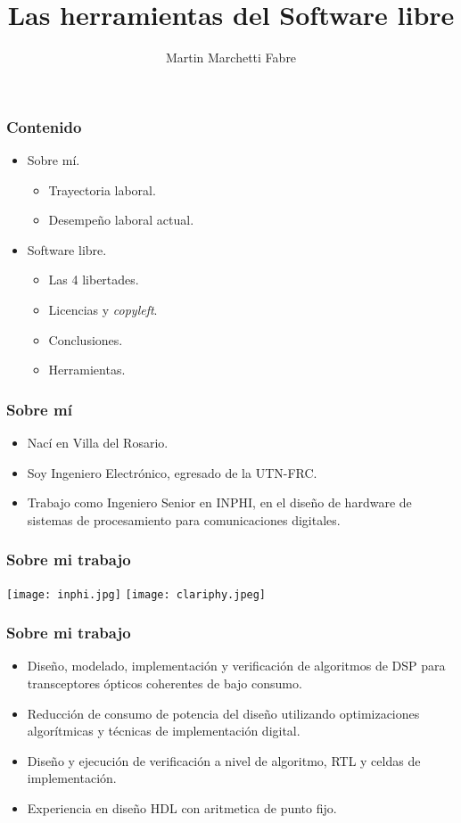 \documentclass[12pt]{beamer}
\title{Las herramientas del Software libre}
\author{Martin Marchetti Fabre}
\begin{document}
\frame{\titlepage}


\begin{frame}%
  \frametitle{Contenido}
  \begin{itemize}
    \item<2-> Sobre mí.
      \begin{itemize}
      \item<3-> Trayectoria laboral.
      \item<4-> Desempeño laboral actual.
      \end{itemize}
    \item<5-> Software libre.    
      \begin{itemize}
      \item<6-> Las 4 libertades.             
      \item<7-> Licencias y \textit{copyleft}.
      \item<8-> Conclusiones.
      \item<9-> Herramientas.
      \end{itemize}
    \end{itemize}
\end{frame}

\begin{frame}%
  \frametitle{Sobre mí}
  \begin{itemize}
  \item Nací en Villa del Rosario. 
  \item Soy Ingeniero Electrónico, egresado de la UTN-FRC.
  \item Trabajo como Ingeniero Senior en INPHI, en el diseño de hardware de sistemas de procesamiento para comunicaciones digitales.
  \end{itemize}
\end{frame}


\begin{frame}%
  \frametitle{Sobre mi trabajo}
  \begin{center}
    \texttt{[image: inphi.jpg]}
    \texttt{[image: clariphy.jpeg]}
  \end{center}
\end{frame}

\begin{frame}%
  \frametitle{Sobre mi trabajo}
  \begin{itemize}
  \item Diseño, modelado, implementación y verificación de algoritmos de DSP para transceptores ópticos coherentes de bajo consumo.
  \item Reducción de consumo de potencia del diseño utilizando optimizaciones algorítmicas y técnicas de implementación digital.
  \item Diseño y ejecución de verificación a nivel de algoritmo, RTL y celdas de implementación.
  \item Experiencia en diseño HDL con aritmetica de punto fijo.
  \end{itemize}
\end{frame}
\end{document}
